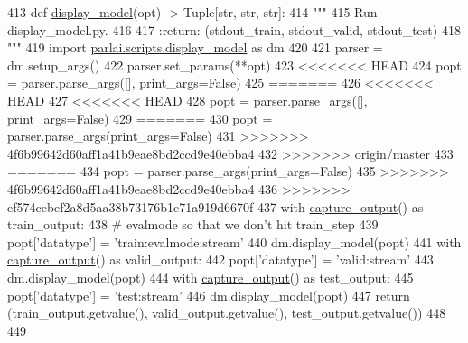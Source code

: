 \begin{DoxyCode}
413 \textcolor{keyword}{def }\hyperlink{namespaceparlai_1_1utils_1_1testing_a1b41200277931b2e4e684dc9452889a9}{display\_model}(opt) -> Tuple[str, str, str]:
414     \textcolor{stringliteral}{"""}
415 \textcolor{stringliteral}{    Run display\_model.py.}
416 \textcolor{stringliteral}{}
417 \textcolor{stringliteral}{    :return: (stdout\_train, stdout\_valid, stdout\_test)}
418 \textcolor{stringliteral}{    """}
419     \textcolor{keyword}{import} \hyperlink{namespaceparlai_1_1scripts_1_1display__model}{parlai.scripts.display\_model} \textcolor{keyword}{as} dm
420 
421     parser = dm.setup\_args()
422     parser.set\_params(**opt)
423 <<<<<<< HEAD
424     popt = parser.parse\_args([], print\_args=\textcolor{keyword}{False})
425 =======
426 <<<<<<< HEAD
427 <<<<<<< HEAD
428     popt = parser.parse\_args([], print\_args=\textcolor{keyword}{False})
429 =======
430     popt = parser.parse\_args(print\_args=\textcolor{keyword}{False})
431 >>>>>>> 4f6b99642d60aff1a41b9eae8bd2ccd9e40ebba4
432 >>>>>>> origin/master
433 =======
434     popt = parser.parse\_args(print\_args=\textcolor{keyword}{False})
435 >>>>>>> 4f6b99642d60aff1a41b9eae8bd2ccd9e40ebba4
436 >>>>>>> ef574cebef2a8d5aa38b73176b1e71a919d6670f
437     with \hyperlink{namespaceparlai_1_1utils_1_1testing_ab00d4d693202afab92c06387aa50699b}{capture\_output}() \textcolor{keyword}{as} train\_output:
438         \textcolor{comment}{# evalmode so that we don't hit train\_step}
439         popt[\textcolor{stringliteral}{'datatype'}] = \textcolor{stringliteral}{'train:evalmode:stream'}
440         dm.display\_model(popt)
441     with \hyperlink{namespaceparlai_1_1utils_1_1testing_ab00d4d693202afab92c06387aa50699b}{capture\_output}() \textcolor{keyword}{as} valid\_output:
442         popt[\textcolor{stringliteral}{'datatype'}] = \textcolor{stringliteral}{'valid:stream'}
443         dm.display\_model(popt)
444     with \hyperlink{namespaceparlai_1_1utils_1_1testing_ab00d4d693202afab92c06387aa50699b}{capture\_output}() \textcolor{keyword}{as} test\_output:
445         popt[\textcolor{stringliteral}{'datatype'}] = \textcolor{stringliteral}{'test:stream'}
446         dm.display\_model(popt)
447     \textcolor{keywordflow}{return} (train\_output.getvalue(), valid\_output.getvalue(), test\_output.getvalue())
448 
449 
\end{DoxyCode}
\mbox{\label{namespaceparlai_1_1utils_1_1testing_ae0c93fc8f4c3e079333dba0065fa4dd2}} 
